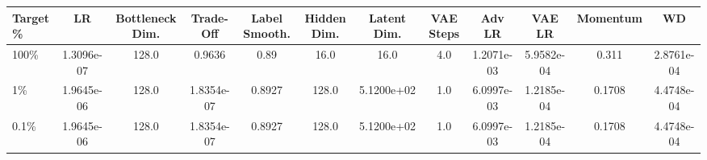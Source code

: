 \begin{tabular}{l | c c c c c c c c c c c}
\toprule
Target \% & LR & Bottleneck Dim. & Trade-Off & Label Smooth. & Hidden Dim. & Latent Dim. & VAE Steps  & Adv LR & VAE LR & Momentum & WD \\
\midrule
100\% & 1.3096e-07 & 128.0 & 0.9636 & 0.89 & 16.0 & 16.0 & 4.0  & 1.2071e-03 & 5.9582e-04 & 0.311 & 2.8761e-04 \\
1\% & 1.9645e-06 & 128.0 & 1.8354e-07 & 0.8927 & 128.0 & 5.1200e+02 & 1.0  & 6.0997e-03 & 1.2185e-04 & 0.1708 & 4.4748e-04 \\
0.1\% & 1.9645e-06 & 128.0 & 1.8354e-07 & 0.8927 & 128.0 & 5.1200e+02 & 1.0  & 6.0997e-03 & 1.2185e-04 & 0.1708 & 4.4748e-04 \\
\bottomrule
\end{tabular}
